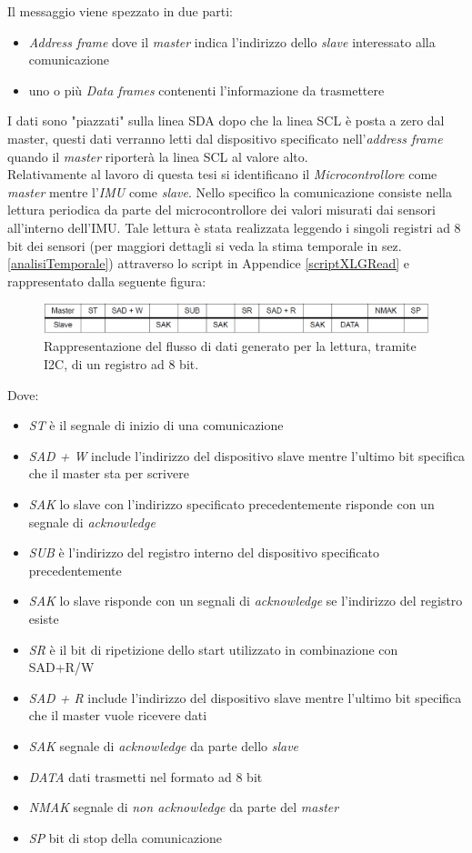 Il messaggio viene spezzato in due parti:
\begin{itemize}
	\item \textit{Address frame} dove il \textit{master} indica l'indirizzo dello \textit{slave} interessato alla comunicazione
	\item uno o più \textit{Data frames} contenenti l'informazione da trasmettere
\end{itemize}
I dati sono "piazzati" sulla linea SDA dopo che la linea SCL è posta a zero dal master, questi dati verranno letti dal dispositivo specificato nell'\textit{address frame} quando il \textit{master} riporterà la linea SCL al valore alto.\\
Relativamente al lavoro di questa tesi si identificano il \textit{Microcontrollore} come \textit{master} mentre l'\textit{IMU} come \textit{slave}. Nello specifico la comunicazione consiste nella lettura periodica da parte del microcontrollore dei valori misurati dai sensori all'interno dell'IMU. Tale lettura è stata realizzata leggendo i singoli registri ad 8 bit dei sensori (per maggiori dettagli si veda la stima temporale in sez.\ref{analisiTemporale}) attraverso lo script in Appendice \ref{scriptXLGRead} e rappresentato dalla seguente figura:
\begin{figure}[H]  
	\centering 
	\includegraphics[scale=0.5]{implementazione/i2cRead.png}
	\caption{Rappresentazione del flusso di dati generato per la lettura, tramite I2C, di un registro ad 8 bit.}
	\label{fig:i2cRead}
\end{figure}
Dove:
\begin{itemize}
	\item  \textit{ST} è il segnale di inizio di una comunicazione
	\item \textit{SAD + W} include l'indirizzo del dispositivo slave mentre l'ultimo bit specifica che il master sta per scrivere
	\item \textit{SAK} lo slave con l'indirizzo specificato precedentemente risponde con un segnale di \textit{acknowledge}
	\item \textit{SUB} è l'indirizzo del registro interno del dispositivo specificato precedentemente
	\item \textit{SAK} lo slave risponde con un segnali di \textit{acknowledge} se l'indirizzo del registro esiste
	\item \textit{SR} è il bit di ripetizione dello start utilizzato in combinazione con SAD+R/W
	\item \textit{SAD + R} include l'indirizzo del dispositivo slave mentre l'ultimo bit specifica che il master vuole ricevere dati
	\item \textit{SAK} segnale di \textit{acknowledge} da parte dello \textit{slave}
	\item \textit{DATA} dati trasmetti nel formato ad 8 bit
	\item \textit{NMAK} segnale di  \textit{non acknowledge} da parte del \textit{master}
	\item \textit{SP} bit di stop della comunicazione
\end{itemize}

